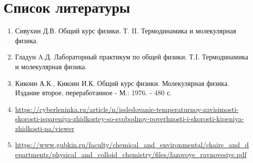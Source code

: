 \documentclass[a4paper,10pt]{article} %
\begin{document}
\section{Список литературы}
	\begin{enumerate}
		\item Сивухин Д.В. Общий курс физики. Т. II. Термодинамика и молекулярная физика.
		\item Гладун A.Д. Лабораторный практикум по общей физики. Т.I. Термодинамика и молекулярная физика.
		\item Кикоин А.К., Кикоин И.К. Общий курс физики. Молекулярная физика. Издание второе, переработанное - М.: 1976. - 480 с.
		\item \url{https://cyberleninka.ru/article/n/issledovanie-temperaturnoy-zavisimosti-skorosti-ispareniya-zhidkostey-so-svobodnoy-poverhnosti-i-skorosti-kipeniya-zhidkosti-na/viewer}
		\item \url{https://www.gubkin.ru/faculty/chemical_and_environmental/chairs_and_departments/physical_and_colloid_chemistry/files/fazovoye_ravnovesiye.pdf}

	\end{enumerate}
\end{document}
